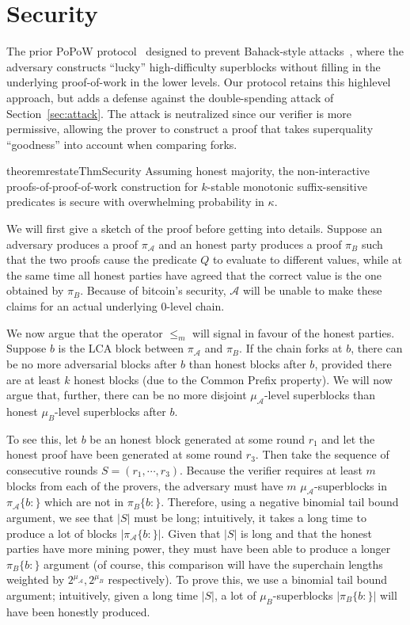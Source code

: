 \section{Security}

The prior PoPoW protocol~\cite{KLS} designed to prevent Bahack-style
attacks~\cite{bahack}, where the adversary constructs ``lucky'' high-difficulty
superblocks without filling in the underlying proof-of-work in the lower levels.
Our protocol retains this highlevel approach, but adds a defense against the
double-spending attack of Section~\ref{sec:attack}. The attack is neutralized
since our verifier is more permissive, allowing the prover to construct a proof
that takes superquality ``goodness'' into account when comparing forks.

\begin{restatable}{theorem}{restateThmSecurity}
    \label{thm.security}
    Assuming honest majority, the non-interactive proofs-of-proof-of-work
    construction for $k$-stable monotonic suffix-sensitive predicates is secure
    with overwhelming probability in $\kappa$.
\end{restatable}

We will first give a sketch of the proof before getting into
details. Suppose an adversary produces a proof $\pi_\mathcal{A}$ and an honest
party produces a proof $\pi_B$ such that the two proofs cause the predicate $Q$
to evaluate to different values, while at the same time all honest parties have
agreed that the correct value is the one obtained by $\pi_B$. Because of
bitcoin's security, $\mathcal{A}$ will be unable to make these claims for an
actual underlying 0-level chain.

We now argue that the operator $\leq_m$ will
signal in favour of the honest parties.
Suppose $b$ is the LCA block between $\pi_\mathcal{A}$ and $\pi_B$. If the chain
forks at $b$, there can be no more adversarial blocks after $b$ than honest
blocks after $b$, provided there are at least $k$ honest blocks (due to the
Common Prefix property). We will now argue that, further, there can be no more
disjoint $\mu_\mathcal{A}$-level superblocks than honest $\mu_B$-level
superblocks after $b$.

To see this, let $b$ be an honest block generated at some round $r_1$ and let
the honest proof have been generated at some round $r_3$. Then take the sequence
of consecutive rounds $S = (r_1, \cdots, r_3)$. Because the verifier requires at
least $m$ blocks from each of the provers, the adversary must have $m$
$\mu_\mathcal{A}$-superblocks in $\pi_\mathcal{A}\{b:\}$ which are not in
$\pi_B\{b:\}$. Therefore, using a negative binomial tail bound argument, we see
that $|S|$ must be long; intuitively, it takes a long time to produce a lot of
blocks $|\pi_\mathcal{A}\{b:\}|$. Given that $|S|$ is long and that the honest
parties have more mining power, they must have been able to produce a longer
$\pi_B\{b:\}$ argument (of course, this comparison will have the superchain
lengths weighted by $2^{\mu_\mathcal{A}}, 2^{\mu_B}$ respectively). To prove
this, we use a binomial tail bound argument; intuitively, given a long time
$|S|$, a lot of $\mu_B$-superblocks $|\pi_B\{b:\}|$ will have been honestly
produced.

